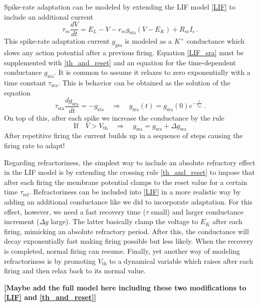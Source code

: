 \documentclass[titlepage]{article}
\begin{document}
Spike-rate adaptation can be modeled by extending the LIF model \eqref{LIF} to include an additional current
\begin{equation}\label{LIF_sra}
\tau_m \frac{d V}{d t} = E_L - V - r_m g_{\text{sra}}(V - E_K) + R_m I_e\,.
\end{equation}
This spike-rate adaptation current $g_{\text{gsa}}$ is modeled as a $K^+$ conductance which slows any action potential after a previous firing. Equation \eqref{LIF_sra} must be supplemented with \eqref{th_and_reset} and an equation for the time-dependent conductance $g_{\text{sra}}$. It is common to assume it relaxes to zero exponentially with a time constant $\tau_{\text{sra}}$. This is behavior can be obtained as the solution of the equation
\begin{equation}\label{g_sra}
\tau_{\text{sra}} \frac{d g_{\text{sra}}}{d t} = - g_{\text{sra}} \quad \Rightarrow \quad g_{\text{sra}}(t) = g_{\text{sra}}(0) e^{- \frac{t}{\tau_{\text{sra}}}}\,.
\end{equation}
On top of this, after each spike we increase the conductance by the rule
\begin{equation}\label{g_sra_increment}
\text{If} \quad V > V_{\text{th}} \quad \Rightarrow \quad g_{\text{sra}} = g_{\text{sra}} + \Delta g_{\text{sra}}
\end{equation}
After repetitive firing the current builds up in a sequence of steps causing the firing rate to adapt!

Regarding refractoriness, the simplest way to include an absolute refractory effect in the LIF model is by extending the crossing rule \eqref{th_and_reset} to impose that after each firing the membrane potential clamps to the reset value for a certain time $\tau_{\text{ref}}$. Refractoriness can be included into \eqref{LIF} in a more realistic way by adding an additional conductance like we did to incorporate adaptation. For this effect, however, we need a fast recovery time ($\tau$ small) and larger conductance increment ($\Delta g$ large). The latter basically clamp the voltage to $E_K$ after each firing, mimicking an absolute refractory period. After this, the conductance will decay exponentially fast making firing possible but less likely. When the recovery is completed, normal firing can resume. Finally, yet another way of modeling refractoriness is by promoting $V_{\text{th}}$ to a dynamical variable which raises after each firing and then relax back to its normal value.

\textbf{[Maybe add the full model here including these two modifications to \eqref{LIF} and \eqref{th_and_reset}]}
\end{document}

